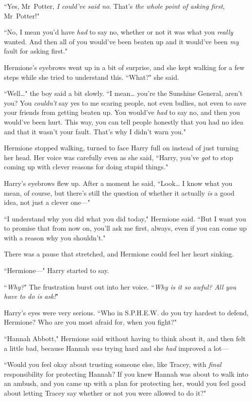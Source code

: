 ``Yes, Mr~Potter, \emph{I could've said no}. That's \emph{the whole point of asking first}, Mr~Potter!"

``No, I mean you'd have \emph{had} to say no, whether or not it was what you \emph{really} wanted. And then all of you would've been beaten up and it would've been \emph{my} fault for asking first."

Hermione's eyebrows went up in a bit of surprise, and she kept walking for a few steps while she tried to understand this. ``What?" she said.

``Well{\ldots}" the boy said a bit slowly. ``I mean{\ldots} you're the Sunshine General, aren't you? You \emph{couldn't} say yes to me scaring people, not even bullies, not even to save your friends from getting beaten up. You would've \emph{had} to say no, and then you would've been hurt. This way, you can tell people honestly that you had no idea and that it wasn't your fault. That's why I didn't warn you."

Hermione stopped walking, turned to face Harry full on instead of just turning her head. Her voice was carefully even as she said, ``Harry, you've \emph{got} to stop coming up with clever reasons for doing stupid things."

Harry's eyebrows flew up. After a moment he said, ``Look{\ldots} I know what you mean, of course, but there's still the question of whether it actually \emph{is} a good idea, not just a clever one—"

``I understand why you did what you did today," Hermione said. ``But I want you to promise that from now on, you'll ask me first, always, even if you can come up with a reason why you shouldn't."

There was a pause that stretched, and Hermione could feel her heart sinking.

``Hermione—" Harry started to say.

``\emph{Why?}" The frustration burst out into her voice. ``\emph{Why is it so awful? All you have to do is ask!}"

Harry's eyes were very serious. ``Who in S.P.H.E.W. do you try hardest to defend, Hermione? Who are you most afraid for, when you fight?"

``Hannah Abbott," Hermione said without having to think about it, and then felt a little bad, because Hannah \emph{was} trying hard and she \emph{had} improved a lot—

``Would you feel okay about trusting someone else, like Tracey, with \emph{final} responsibility for protecting Hannah? If you knew Hannah was about to walk into an ambush, and you came up with a plan for protecting her, would you feel good about letting Tracey say whether or not you were allowed to do it?"

